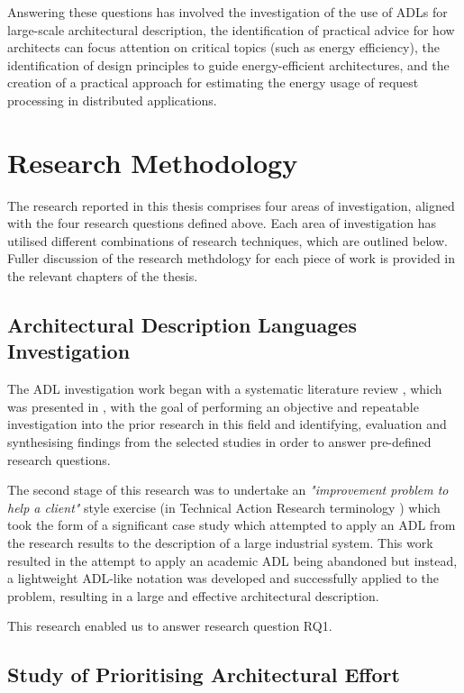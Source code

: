 Answering these questions has involved the investigation of the use of ADLs for large-scale architectural description, the identification of practical advice for how architects can focus attention on critical topics (such as energy efficiency), the identification of design principles to guide energy-efficient architectures, and the creation of a practical approach for estimating the energy usage of request processing in distributed applications.

\section{Research Methodology}

The research reported in this thesis comprises four areas of investigation, aligned with the four research questions defined above.  Each area of investigation has utilised different combinations of research techniques, which are outlined below.  Fuller discussion of the research methdology for each piece of work is provided in the relevant chapters of the thesis.

\subsection{Architectural Description Languages Investigation}

The ADL investigation work began with a systematic literature review \cite{kitchenham2007-slr}, which was presented in , with the goal of performing an objective and repeatable investigation into the prior research in this field and identifying, evaluation and synthesising findings from the selected studies in order to answer pre-defined research questions.  

The second stage of this research was to undertake an \emph{"improvement problem to help a client"} style exercise (in Technical Action Research terminology \cite{wieringa2012-tar}) which took the form of a significant case study which attempted to apply an ADL from the research results to the description of a large industrial system.  This work resulted in the attempt to apply an academic ADL being abandoned but instead, a lightweight ADL-like notation was developed and successfully applied to the problem, resulting in a large and effective architectural description.

This research enabled us to answer research question RQ1.

\subsection{Study of Prioritising Architectural Effort}

